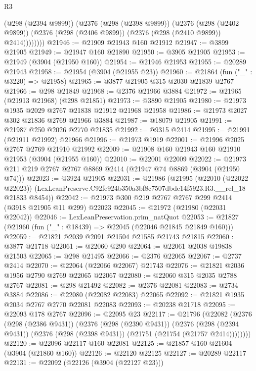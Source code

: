 \begin{lexlean}{R3}
\begin{coremodule}
            (@298 (@2394 @9899))
            (@2376
              (@298 (@2398 @9899))
              (@2376
                (@298 (@2402 @9899))
                (@2376 (@298 (@2406 @9899)) (@2376 (@298 (@2410 @9899)) @2414))))))))
@21946 := @21909 @21943 @160 @21912
@21947 := @3899 @21905
@21949 := @21947 @160 @21890
@21950 := @3905 @21905
@21953 := @21949 (@3904 (@21950 @160))
@21954 := @21946 @21953
@21955 := @20289 @21943
@21958 := @21954 (@3904 (@21955 @23))
@21960 := @21864 (fun ("_" : @3220) => @21958)
@21965 := @3877 @21905 @315 @2030 @21839 @2767
@21966 := @298 @21849
@21968 := @2376 @21966 @3884
@21972 := @21965 (@21913 @21968) (@298 @21851)
@21973 := @3890 @21905
@21980 := @21973 @1935 @2029 @2767 @21838 @21912 @21968 @21958
@21986 := @21973 @2027 @302 @21836 @2769 @21966 @3884
@21987 := @18079 @21905
@21991 := @21987 @250 @2026 @2770 @21835
@21992 := @9315 @2414
@21995 := @21991 (@21911 @21992) @21966
@21996 := @21973 @1919
@22001 := @21996 @2025 @2767 @2769 @21910 @21992
@22009 := @21908 @160 @21943 @160 @21910 @21953 (@3904 (@21955 @160))
@22010 := @22001 @22009
@22022 := @21973 @211 @219 @2767 @2767 @8869 @2414 (@21947 @74 @8869 (@3904 (@21950 @74)))
@22023 := @3924 @21905
@22031 := @21986
    (@21995
      (@22010 (@22022 @22023))
      (LexLeanPreserve.C92fe924b350a3bf8c7507dbdc14f5923.R3.__rel_18 @21833 @8454))
@22042 := @21973 @300 @219 @2767 @2767 @299 @2414 (@3918 @21905 @11 @299) @22023
@22045 := @21972 (@21980 (@22031 @22042))
@22046 := LexLeanPreservation.prim_natQuot
@22053 := @21827 (@21960 (fun ("_" : @18439) => @22045 (@22046 @21845 @21849 @160)))
@22059 := @21821 @2039 @2091 @21504 @21585 @21743 @21815
@22060 := @3877 @21718
@22061 := @22060 @290
@22064 := @22061 @2038 @19838 @21503
@22065 := @298 @21495
@22066 := @2376 @22065
@22067 := @2737 @2414
@22070 := @22064 (@22066 @22067) @21743
@22076 := @21821 @2036 @1956 @2790 @2769 @22065 @22067
@22080 := @22060 @315 @2035 @2788 @2767
@22081 := @298 @21492
@22082 := @2376 @22081
@22083 := @2734 @3884
@22086 := @22080 (@22082 @22083) @22065
@22092 := @21821 @1935 @2034 @2767 @2770 @22081 @22083
@22093 := @20238 @21718
@22095 := @22093 @178 @2767
@22096 := @22095 @23
@22117 := @21796
    (@22082
      (@2376
        (@298 (@2386 @9431))
        (@2376
          (@298 (@2390 @9431))
          (@2376
            (@298 (@2394 @9431))
            (@2376 (@298 (@2398 @9431)) (@21751 (@21754 (@21757 @2414))))))))
@22120 := @22096 @22117 @160 @22081
@22125 := @21857 @160 @21604 (@3904 (@21860 @160))
@22126 := @22120 @22125
@22127 := @20289 @22117
@22131 := @22092 (@22126 (@3904 (@22127 @23)))

\end{coremodule}
\end{lexlean}
